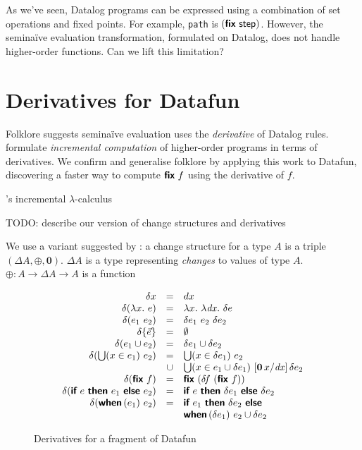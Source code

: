 \documentclass[sigplan,screen,review,timestamp,dvipsnames]{acmart}
\newcommand{\todo}[1]{{\color{ACMPurple}#1}}
\newcommand{\naive}{na\"ive}
\newcommand{\D}{\Delta}
\newcommand{\fn}{\lambda}
\newcommand{\binder}{.~}
\newcommand{\bind}[1]{#1\binder}
\newcommand{\fnof}[1]{\fn\bind{#1}}
\renewcommand{\d}{\delta}
\newcommand{\zero}{\mathbf{0}}
\newcommand{\kw}[1]{\textsf{\bfseries #1}}
\newcommand{\tlv}[1]{\textsf{#1}}
\newcommand{\var}[1]{\mathit{#1}}
\newcommand{\dee}[1]{\var{d#1}}
\newcommand{\subst}[1]{[#1]\,}
\newcommand{\eset}[1]{\{#1\}}
\newcommand{\ewhen}[1]{\kw{when}\,(#1)~}
\newcommand{\eif}[2]{\kw{if}~#1~\kw{then}~#2~\kw{else}~}
\newcommand{\efor}[1]{\bigcup(#1)~}
\newcommand{\elet}[1]{\kw{let}~#1~\kw{in}~}
\newcommand{\efix}{\kw{fix}~}
\begin{document}
As we've seen, Datalog programs can be expressed using a combination of set
operations and fixed points. For example, \texttt{path} is
$(\efix{\tlv{step}})$. However, the semi\naive{} evaluation transformation,
formulated on Datalog, does not handle higher-order functions. Can we lift this limitation?

\section{Derivatives for Datafun}


Folklore suggests semi\naive{} evaluation uses the \emph{derivative} of Datalog
rules.
%
\citet{incremental} formulate \emph{incremental computation} of higher-order
programs in terms of derivatives.
%
We confirm and generalise folklore by applying this work to Datafun, discovering
a faster way to compute $\efix f$ using the derivative of $f$.

's incremental $\lambda$-calculus


\todo{TODO: describe our version of change structures and derivatives}

We use a variant suggested by \citet{atkey-changes}: a change structure for a
type $A$ is a triple $(\D A, \oplus, \zero)$. $\D A$ is a type representing
\emph{changes} to values of type $A$.
%
$\oplus : A \to \Delta A \to A$ is a function

\begin{figure}
  \[\begin{array}{rcl}
    \d x &=& dx\\
    \d(\fnof x e) &=& \fnof x \fnof{\dee x} \d{e}\\
    \d(e_1~e_2) &=& \d{e_1}~e_2~\d{e_2}\\
    \d{\eset{\vec e}} &=& \emptyset\\
    \d(e_1 \cup e_2) &=& \d{e_1} \cup \d{e_2}\\
    \d(\efor{x \in e_1} e_2)
    &=& \efor{x \in \d{e_1}} e_2\\
    &\cup& \efor{x \in e_1 \cup \d{e_1}}
    \subst{\zero\, x / \dee x}
    \d{e_2}
    \\
    \d(\efix f) &=& \efix (\d\!f~(\efix f))\\
    \d(\eif{e}{e_1}{e_2}) &=& \eif{e}{\d{e_1}}{\d{e_2}}\\
    \d(\ewhen{e_1}{e_2})
    &=& \eif{e_1}{\d{e_2}}\\
    && \ewhen{\d{e_1}} {e_2 \cup \d{e_2}}
  \end{array}\]
  \vspace{-.8em}
  \caption{Derivatives for a fragment of Datafun}
  \label{fig:derivatives}
\end{figure}
\end{document}
